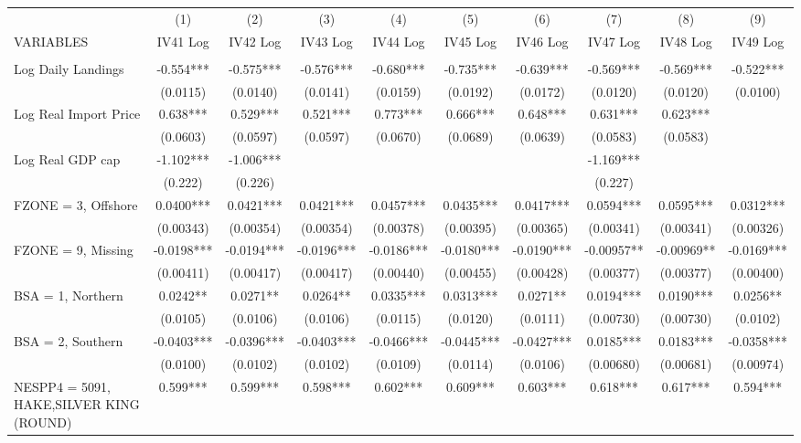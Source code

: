 \begin{tabular}{lccccccccc} \hline
 & (1) & (2) & (3) & (4) & (5) & (6) & (7) & (8) & (9) \\
VARIABLES & IV41 Log & IV42 Log & IV43 Log & IV44 Log & IV45 Log & IV46 Log & IV47 Log & IV48 Log & IV49 Log \\ \hline
 &  &  &  &  &  &  &  &  &  \\
Log Daily Landings & -0.554*** & -0.575*** & -0.576*** & -0.680*** & -0.735*** & -0.639*** & -0.569*** & -0.569*** & -0.522*** \\
 & (0.0115) & (0.0140) & (0.0141) & (0.0159) & (0.0192) & (0.0172) & (0.0120) & (0.0120) & (0.0100) \\
Log Real Import Price & 0.638*** & 0.529*** & 0.521*** & 0.773*** & 0.666*** & 0.648*** & 0.631*** & 0.623*** &  \\
 & (0.0603) & (0.0597) & (0.0597) & (0.0670) & (0.0689) & (0.0639) & (0.0583) & (0.0583) &  \\
Log Real GDP cap & -1.102*** & -1.006*** &  &  &  &  & -1.169*** &  &  \\
 & (0.222) & (0.226) &  &  &  &  & (0.227) &  &  \\
FZONE = 3, Offshore & 0.0400*** & 0.0421*** & 0.0421*** & 0.0457*** & 0.0435*** & 0.0417*** & 0.0594*** & 0.0595*** & 0.0312*** \\
 & (0.00343) & (0.00354) & (0.00354) & (0.00378) & (0.00395) & (0.00365) & (0.00341) & (0.00341) & (0.00326) \\
FZONE = 9, Missing & -0.0198*** & -0.0194*** & -0.0196*** & -0.0186*** & -0.0180*** & -0.0190*** & -0.00957** & -0.00969** & -0.0169*** \\
 & (0.00411) & (0.00417) & (0.00417) & (0.00440) & (0.00455) & (0.00428) & (0.00377) & (0.00377) & (0.00400) \\
BSA = 1, Northern & 0.0242** & 0.0271** & 0.0264** & 0.0335*** & 0.0313*** & 0.0271** & 0.0194*** & 0.0190*** & 0.0256** \\
 & (0.0105) & (0.0106) & (0.0106) & (0.0115) & (0.0120) & (0.0111) & (0.00730) & (0.00730) & (0.0102) \\
BSA = 2, Southern & -0.0403*** & -0.0396*** & -0.0403*** & -0.0466*** & -0.0445*** & -0.0427*** & 0.0185*** & 0.0183*** & -0.0358*** \\
 & (0.0100) & (0.0102) & (0.0102) & (0.0109) & (0.0114) & (0.0106) & (0.00680) & (0.00681) & (0.00974) \\
NESPP4 = 5091, HAKE,SILVER KING (ROUND) & 0.599*** & 0.599*** & 0.598*** & 0.602*** & 0.609*** & 0.603*** & 0.618*** & 0.617*** & 0.594*** \\

\end{tabular}

